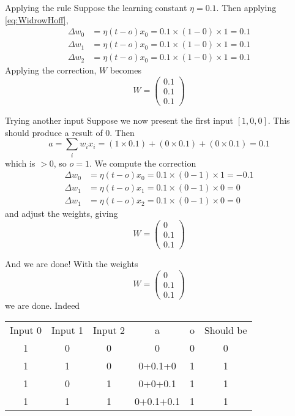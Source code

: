 \documentclass[aspectratio=169]{beamer}\usepackage[]{graphicx}\usepackage[]{xcolor}
\begin{document}
\begin{frame}{Applying the rule}
    Suppose the learning constant $\eta=0.1$. Then applying \eqref{eq:WidrowHoff},
    \begin{align*}
        \Delta w_0 &= \eta(t-o)x_0 = 0.1\times(1-0)\times 1= 0.1 \\
        \Delta w_1 &= \eta(t-o)x_0 = 0.1\times(1-0)\times 1= 0.1 \\
        \Delta w_2 &= \eta(t-o)x_0 = 0.1\times(1-0)\times 1= 0.1         
    \end{align*}
    Applying the correction, $W$ becomes
    \[
        W=\begin{pmatrix}
            0.1\\ 0.1\\ 0.1
        \end{pmatrix}
    \]
\end{frame}

\begin{frame}{Trying another input}
    Suppose we now present the first input $[1,0,0]$. This should produce a result of 0. Then
    \[
        a = \sum_i w_ix_i = (1\times 0.1)+(0\times 0.1)+(0\times 0.1) = 0.1
    \]
    which is $>0$, so $o=1$. We compute the correction
    \begin{align*}
        \Delta w_0 &= \eta(t-o)x_0 = 0.1\times(0-1)\times 1= -0.1 \\
        \Delta w_1 &= \eta(t-o)x_1 = 0.1\times(0-1)\times 0= 0 \\
        \Delta w_1 &= \eta(t-o)x_2 = 0.1\times(0-1)\times 0= 0         
    \end{align*}
    and adjust the weights, giving
    \[
        W=\begin{pmatrix}
            0\\ 0.1\\ 0.1
        \end{pmatrix}
    \]
\end{frame}

\begin{frame}{And we are done!}
    With the weights
    \[
        W=\begin{pmatrix}
            0\\ 0.1\\ 0.1
        \end{pmatrix}
    \]
    we are done. Indeed
    \begin{center}
        \begin{tabular}{cccccc}
            Input 0 & Input 1 & Input 2 & a & o & Should be \\
            1 & 0 & 0 & 0 & 0 & 0 \\
            1 & 1 & 0 & 0+0.1+0 & 1 & 1 \\
            1 & 0 & 1 & 0+0+0.1 & 1 & 1 \\
            1 & 1 & 1 & 0+0.1+0.1 & 1 & 1 \\
        \end{tabular}
    \end{center}    
\end{frame}
\end{document}
